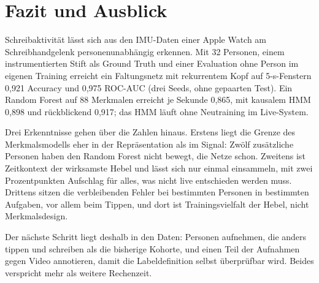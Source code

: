 \section{Fazit und Ausblick}
\label{sec:conclusion}

Schreibaktivität lässt sich aus den IMU-Daten einer Apple Watch am
Schreibhandgelenk personenunabhängig erkennen. Mit 32 Personen, einem
instrumentierten Stift als Ground Truth und einer Evaluation ohne Person im
eigenen Training erreicht ein Faltungsnetz mit rekurrentem Kopf auf
5-s-Fenstern 0,921 Accuracy und 0,975 ROC-AUC (drei Seeds, ohne gepaarten
Test). Ein Random Forest auf 88 Merkmalen erreicht je Sekunde 0,865, mit
kausalem HMM 0,898 und rückblickend 0,917; das HMM läuft ohne Neutraining im
Live-System.

Drei Erkenntnisse gehen über die Zahlen hinaus. Erstens liegt die Grenze des
Merkmalsmodells eher in der Repräsentation als im Signal: Zwölf zusätzliche
Personen haben den Random Forest nicht bewegt, die Netze schon. Zweitens ist
Zeitkontext der wirksamste Hebel und lässt sich nur einmal einsammeln, mit
zwei Prozentpunkten Aufschlag für alles, was nicht live entschieden werden
muss. Drittens sitzen die verbleibenden Fehler bei bestimmten Personen in
bestimmten Aufgaben, vor allem beim Tippen, und dort ist Trainingsvielfalt
der Hebel, nicht Merkmalsdesign.

Der nächste Schritt liegt deshalb in den Daten: Personen aufnehmen, die anders
tippen und schreiben als die bisherige Kohorte, und einen Teil der Aufnahmen
gegen Video annotieren, damit die Labeldefinition selbst überprüfbar wird.
Beides verspricht mehr als weitere Rechenzeit.
